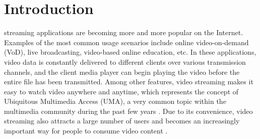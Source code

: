 \documentclass[journal]{IEEEtran}
\begin{document}
%
\IEEEpeerreviewmaketitle



\section{Introduction}
\label{sec:intro}
% 
% 
% 
% 
 streaming applications are becoming more and more popular on the Internet. Examples of the most common usage scenarios include online video-on-demand (VoD), live broadcasting, video-based online education, etc. In these applications, video data is constantly delivered to different clients over various transmission channels, and the client media player can begin playing the video before the entire file has been transmitted. Among other features, video streaming makes it easy to watch video anywhere and anytime, which represents the concept of Ubiquitous Multimedia Access (UMA), a very common topic within the multimedia community during the past few years \cite{Gualdi08}. Due to its convenience, video streaming also attracts a large number of users and becomes an increasingly important way for people to consume video content \cite{Chen13}.
\end{document}
